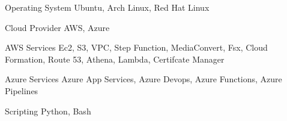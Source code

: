

\begin{cvskills}

  \cvskill
    {Operating System} %
    {Ubuntu, Arch Linux, Red Hat Linux} %

  \cvskill
    {Cloud Provider} %
    {AWS, Azure} %

  \cvskill
    {AWS Services} %
    {Ec2, S3, VPC, Step Function, MediaConvert, Fsx, Cloud Formation, Route 53, Athena, Lambda, Certifcate Manager} %

  \cvskill
    {Azure Services} %
    {Azure App Services, Azure Devops, Azure Functions, Azure Pipelines} %

  \cvskill
    {Scripting} %
    {Python, Bash} %

\end{cvskills}